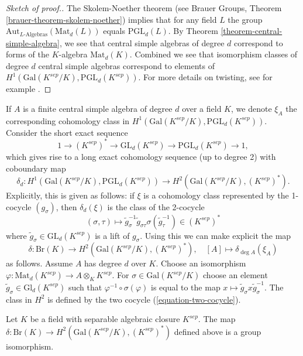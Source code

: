 \begin{proof}[Sketch of proof.]
The Skolem-Noether theorem (see
Brauer Groups, Theorem \ref{brauer-theorem-skolem-noether})
implies that for any field $L$ the group
$\text{Aut}_{L\text{-Algebras}}(\text{Mat}_d(L))$
equals $\text{PGL}_d(L)$. By
Theorem \ref{theorem-central-simple-algebra}, we see that
central simple algebras of degree $d$ correspond
to forms of the $K$-algebra $\text{Mat}_d(K)$.
Combined we see that isomorphism classes of degree $d$ central
simple algebras correspond to elements of
$H^1(\text{Gal}(K^{sep}/K), \text{PGL}_d(K^{sep}))$.
For more details on twisting, see for example
\cite{SilvermanEllipticCurves}.
\end{proof}

\noindent
If $A$ is a finite central simple algebra of degree $d$ over a field $K$,
we denote $\xi_A$ the corresponding cohomology class in
$H^1(\text{Gal}(K^{sep}/K), \text{PGL}_d(K^{sep}))$.
Consider the short exact sequence
$$
1 \to (K^{sep})^* \to \text{GL}_d(K^{sep}) \to \text{PGL}_d(K^{sep}) \to 1,
$$
which gives rise to a long exact cohomology sequence (up to degree 2) with
coboundary map
$$
\delta_d :
H ^1(\text{Gal}(K^{sep}/K), \text{PGL}_d(K^{sep}))
\longrightarrow
H^2(\text{Gal}(K^{sep}/K), (K^{sep})^*).
$$
Explicitly, this is given as follows: if $\xi$ is a cohomology class
represented by the 1-cocycle $(g_\sigma)$, then $\delta_d(\xi)$ is the
class of the 2-cocycle
\begin{equation}
\label{equation-two-cocycle}
(\sigma, \tau)
\longmapsto
\tilde g_\sigma^{-1} \tilde g_{\sigma \tau} \sigma(\tilde g_\tau^{-1})
\in (K^{sep})^*
\end{equation}
where $\tilde g_\sigma \in \text{GL}_d(K^{sep})$ is a lift of $g_\sigma$.
Using this we can make explicit the map
$$
\delta : \text{Br}(K) \longrightarrow H^2(\text{Gal}(K^{sep}/K), (K^{sep})^*),
\quad
[A] \longmapsto \delta_{\deg A} (\xi_A)
$$
as follows. Assume $A$ has degree $d$ over $K$. Choose an isomorphism
$\varphi : \text{Mat}_d(K^{sep}) \to A \otimes_K K^{sep}$. For
$\sigma \in \text{Gal}(K^{sep}/K)$ choose an element
$\tilde g_\sigma \in \text{Gl}_d(K^{sep})$ such that
$\varphi^{-1} \circ \sigma(\varphi)$ is equal to the map
$x \mapsto \tilde g_\sigma x \tilde g_\sigma^{-1}$. The class in $H^2$
is defined by the two cocycle (\ref{equation-two-cocycle}).

\begin{theorem}
\label{theorem-brauer-delta}
Let $K$ be a field with separable algebraic closure $K^{sep}$. The map
$\delta : \text{Br}(K) \to H^2(\text{Gal}(K^{sep}/K), (K^{sep})^*)$
defined above is a group isomorphism.
\end{theorem}

